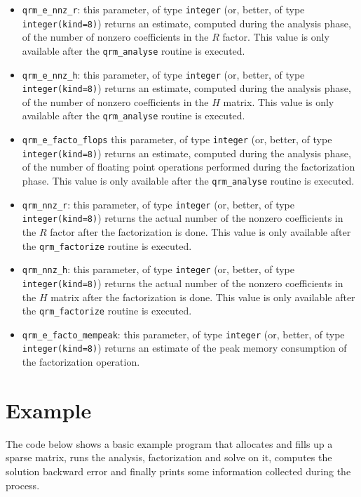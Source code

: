 \documentclass[11pt]{article}
\begin{document}
\begin{itemize}
\item \texttt{qrm\_e\_nnz\_r}: this parameter, of type \texttt{integer}
  (or, better, of type \texttt{integer(kind=8)}) returns an estimate,
  computed during the analysis phase, of the number of nonzero
  coefficients in the $R$ factor. This value is only available after the
  \texttt{qrm\_analyse} routine is executed.
\item \texttt{qrm\_e\_nnz\_h}: this parameter, of type \texttt{integer}
  (or, better, of type \texttt{integer(kind=8)}) returns an estimate,
  computed during the analysis phase, of the number of nonzero
  coefficients in the $H$ matrix. This value is only available after the
  \texttt{qrm\_analyse} routine is executed.
\item \texttt{qrm\_e\_facto\_flops} this parameter, of type
  \texttt{integer} (or, better, of type \texttt{integer(kind=8)})
  returns an estimate, computed during the analysis phase, of the
  number of floating point operations performed during the
  factorization phase. This value is only available after the
  \texttt{qrm\_analyse} routine is executed.
\item \texttt{qrm\_nnz\_r}: this parameter, of type \texttt{integer}
  (or, better, of type \texttt{integer(kind=8)}) returns the actual
  number of the nonzero coefficients in the $R$ factor after the
  factorization is done. This value is only available after the
  \texttt{qrm\_factorize} routine is executed.
\item \texttt{qrm\_nnz\_h}: this parameter, of type \texttt{integer}
  (or, better, of type \texttt{integer(kind=8)}) returns the actual
  number of the nonzero coefficients in the $H$ matrix after the
  factorization is done. This value is only available after the
  \texttt{qrm\_factorize} routine is executed.
\item \texttt{qrm\_e\_facto\_mempeak}: this parameter, of type \texttt{integer}
  (or, better, of type \texttt{integer(kind=8)}) returns an estimate
  of the peak memory consumption of the factorization operation.
\end{itemize}


\section{Example}

The code below shows a basic example program that allocates
and fills up a sparse matrix, runs the analysis, factorization and
solve on it, computes the solution backward error and finally prints
some information collected during the process.
\end{document}

